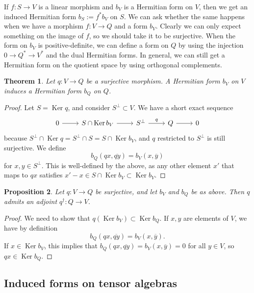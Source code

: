 \documentclass[10pt,a4paper]{amsart}
\newtheorem{theo}{Theorem}[section]
\newtheorem{prop}[theo]{Proposition}
\theoremstyle{definition}
\def\ov#1{\overline{#1}}
\DeclareMathOperator{\Ker}{Ker}
\begin{document}
If $f : S \to V$ is a linear morphism and $b_V$ is a Hermitian form on $V$, then
we get an induced Hermitian form $b_S := f^*b_V$ on $S$. We can ask whether the
same happens when we have a morphism $f : V \to Q$ and a form $b_V$. Clearly we
can only expect something on the image of $f$, so we should take it to be
surjective. When the form on $b_V$ is positive-definite, we can define a form on
$Q$ by using the injection $0 \to Q^* \to V^*$ and the dual Hermitian forms. In
general, we can still get a Hermitian form on the quotient space by using
orthogonal complements.


\begin{theo}
Let $q : V \to Q$ be a surjective morphism. A Hermitian form $b_V$ on $V$ induces a Hermitian form $b_Q$ on $Q$.
\end{theo}

\begin{proof}
Let $S = \Ker q$, and consider $S^\perp \subset V$. We have a short exact sequence
\[
\begin{tikzcd}
0 \ar[r] &
S \cap \Ker b_V \ar[r] &
S^\perp \ar[r,"q"] &
Q \ar[r] &
0
\end{tikzcd}
\]
because $S^\perp \cap \Ker q = S^\perp \cap S = S \cap \Ker b_V$, and $q$ restricted to $S^\perp$ is still surjective. We define
\[
b_Q(qx, \ov{qy})
= b_V(x, \ov y)
\]
for $x, y \in S^\perp$. This is well-defined by the above, as any other element $x'$ that maps to $qx$ satisfies $x' - x \in S \cap \Ker b_V \subset \Ker b_V$.
\end{proof}



\begin{prop}
Let $q : V \to Q$ be surjective, and let $b_V$ and $b_Q$ be as above. Then $q$ admits an adjoint $q^\dagger : Q \to V$.
\end{prop}

\begin{proof}
We need to show that $q(\Ker b_V) \subset \Ker b_Q$. If $x, y$ are elements of $V$, we have by definition
\[
b_Q(qx, \ov{qy}) = b_V(x, \ov y).
\]
If $x \in \Ker b_V$, this implies that $b_Q(qx, \ov{qy}) = b_V(x, \ov y) = 0$ for all $y \in V$, so $qx \in \Ker b_Q$.
\end{proof}





\subsection*{Induced forms on tensor algebras}
\label{sec:induced-forms-tensor}
\end{document}
